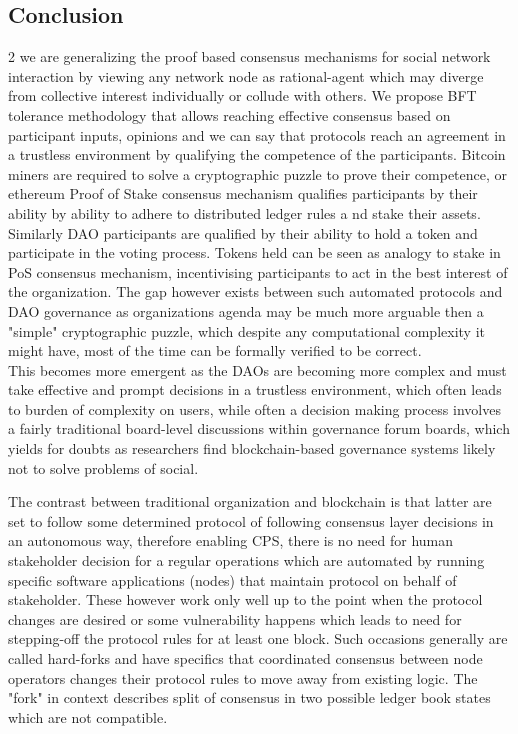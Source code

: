 \documentclass{article}
\begin{document}
\begin{CJK}{UTF8}{gbsn}
\begin{multicols}{2}
        \section{Conclusion}

    \end{multicols}{2}
    we are generalizing the proof based consensus mechanisms for social network interaction by viewing any network node as rational-agent which may diverge from collective interest \cite{Philip2019} individually or collude with others. We propose BFT tolerance methodology that allows reaching effective consensus based on participant inputs, opinions and  we can say that protocols reach an agreement in a trustless environment by qualifying the competence of the participants. Bitcoin miners are required to solve a cryptographic puzzle to prove their competence, or ethereum Proof of Stake consensus mechanism qualifies participants by their ability by ability to adhere to distributed ledger rules a   nd stake their assets. \\ Similarly DAO participants are qualified by their ability to hold a token and participate in the voting process. Tokens held can be seen as analogy to stake in PoS consensus mechanism, incentivising participants to act in the best interest of the organization. The gap however exists between such automated protocols and DAO governance as organizations agenda may be much more arguable then a "simple" cryptographic puzzle, which despite any computational complexity it might have, most of the time can be formally verified to be correct.\\
    This becomes more emergent as the DAOs are becoming more complex and must take effective and prompt decisions in a trustless environment, which often leads to burden of complexity on users, while often a decision making process involves a fairly traditional board-level discussions within governance forum boards, which yields for doubts as researchers find blockchain-based governance systems likely not to solve problems of social.

    The contrast between traditional organization and blockchain is that latter are set to follow some determined protocol of following consensus layer decisions in an autonomous way, therefore enabling CPS, there is no need for human stakeholder decision for a regular operations which are automated by running specific software applications (nodes) that maintain protocol on behalf of stakeholder.
    These however work only well up to the point when the protocol changes are desired or some vulnerability happens which leads to need for stepping-off the protocol rules for at least one block. Such occasions generally are called hard-forks and have specifics that coordinated consensus between node operators changes their protocol rules to move away from existing logic. The "fork" in context describes split of consensus in two possible ledger book states which are not compatible.
    
    

    \clearpage\end{CJK}
    
\end{document}
